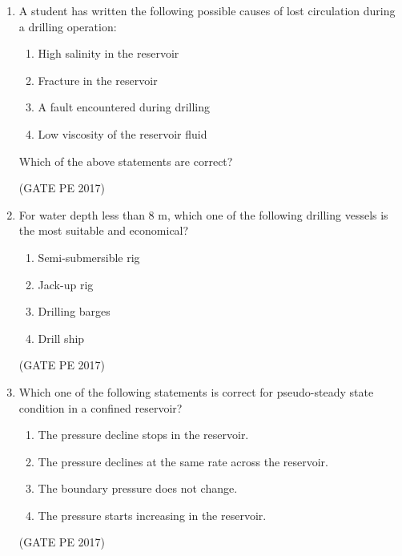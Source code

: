 \documentclass[journal,12pt,onecolumn]{IEEEtran}
\theoremstyle{remark}
\begin{document}
\begin{enumerate}
\item A student has written the following possible causes of lost circulation during a drilling operation:
\begin{enumerate}
\item High salinity in the reservoir \\
\item Fracture in the reservoir \\
\item A fault encountered during drilling \\
\item Low viscosity of the reservoir fluid
\end{enumerate}

Which of the above statements are correct?
\begin{enumerate}
\end{enumerate}
\hfill{(GATE PE 2017)}

\item For water depth less than 8 m, which one of the following drilling vessels is the most suitable and economical?
\begin{enumerate}
    \item Semi-submersible rig
    \item Jack-up rig
    \item Drilling barges
    \item Drill ship
\end{enumerate}
\hfill{(GATE PE 2017)}

\item Which one of the following statements is correct for pseudo-steady state condition in a confined reservoir?
\begin{enumerate}
\item The pressure decline stops in the reservoir.
\item The pressure declines at the same rate across the reservoir.
\item The boundary pressure does not change.
\item The pressure starts increasing in the reservoir.
\end{enumerate}
\hfill{(GATE PE 2017)}


\end{enumerate}
\end{document}
